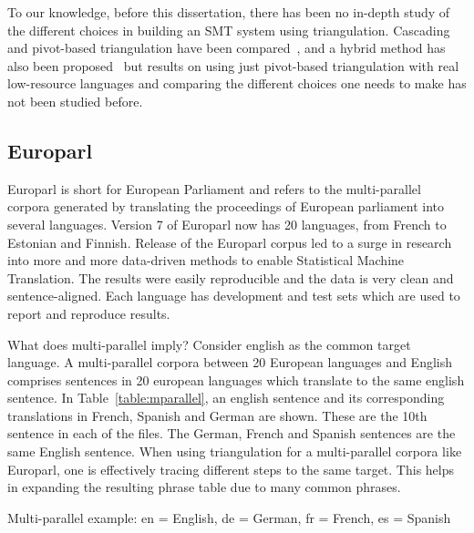  To our knowledge, before this dissertation, there has been no in-depth study of the different choices in building an SMT system using triangulation. Cascading and pivot-based triangulation have been compared~\cite{Utiyama:07,Gispert:06}, and a hybrid method has also been proposed~\cite{Wu:09} but results on using just pivot-based triangulation with real low-resource languages and comparing the different choices one needs to make has not been studied before. 
\subsection{Europarl}
Europarl is short for European Parliament and refers to the multi-parallel corpora generated by translating the proceedings of European parliament into several languages. Version 7 of Europarl now has 20 languages, from French to Estonian and Finnish. Release of the Europarl corpus led to a surge in research into more and more data-driven methods to enable Statistical Machine Translation. The results were easily reproducible and the data is very clean and sentence-aligned. Each language has development and test sets which are used to report and reproduce results. 

What does multi-parallel imply? Consider english as the common target language. A multi-parallel corpora between 20 European languages and English comprises sentences in 20 european languages which translate to the same english sentence. In Table~\ref{table:mparallel}, an english sentence and its corresponding translations in French, Spanish and German are shown. These are the 10th sentence in each of the files. The German, French and Spanish sentences are the same English sentence. When using triangulation for a multi-parallel corpora like Europarl, one is effectively tracing different steps to the same target. This helps in expanding the resulting phrase table due to many common phrases. 

\begin{table}
	\small
	\centering
	\small
	
	\caption{Multi-parallel example: en = English, de = German, fr = French, es = Spanish}
	\label{table:mparallel}
\end{table}

